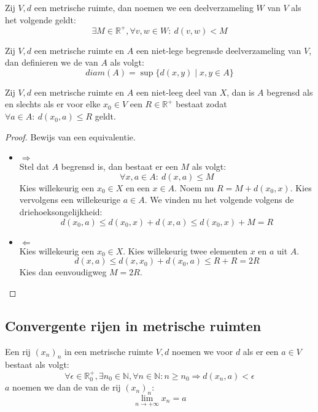 \documentclass[main.tex]{subfiles}
\begin{document}
\begin{de}
  Zij $V,d$ een metrische ruimte, dan noemen we een deelverzameling $W$ van $V$  als het volgende geldt:
  \[ \exists M\in \mathbb{R}^{+}, \forall v,w\in W:\ d(v,w) < M \]
\end{de}

\begin{de}
  Zij $V,d$ een metrische ruimte en $A$ een niet-lege begrensde deelverzameling van $V$, dan definieren we de  van $A$ als volgt:
  \[ diam(A) = \sup\{d(x,y) \mid x,y \in A \} \]
\end{de}

\begin{bpr}
  Zij $V,d$ een metrische ruimte en $A$ een niet-leeg deel van $X$, dan is $A$ begrensd als en slechts als er voor elke $x_{0}\in V$ een $R\in \mathbb{R}^{+}$ bestaat zodat $\forall a\in A:\ d(x_{0},a) \le R$ geldt.

  \begin{proof}
    Bewijs van een equivalentie.
    \begin{itemize}
    \item $\Rightarrow$\\
      Stel dat $A$ begrensd is, dan bestaat er een $M$ als volgt:
      \[ \forall x,a \in A:\ d(x,a) \le M \]
      Kies willekeurig een $x_{0}\in X$ en een $x\in A$.
      Noem nu $R=M + d(x_{0},x)$.
      Kies vervolgens een willekeurige $a\in A$.
      We vinden nu het volgende volgens de driehoeksongelijkheid:
      \[ d(x_{0},a) \le d(x_{0},x) + d(x,a) \le d(x_{0},x) + M = R \]
    \item $\Leftarrow$\\
      Kies willekeurig een $x_{0}\in X$.
      Kies willekeurig twee elementen $x$ en $a$ uit $A$.
      \[ d(x,a) \le d(x,x_{0}) + d(x_{0},a) \le R + R = 2R\]
      Kies dan eenvoudigweg $M=2R$.
    \end{itemize}
  \end{proof}
\end{bpr}

\subsection{Convergente rijen in metrische ruimten}
\label{sec:rijen-metr-ruimt}

\begin{de}
  Een rij $(x_{n})_{n}$ in een metrische ruimte $V,d$ noemen we  voor $d$ als er een $a\in V$ bestaat als volgt:
  \[ \forall \epsilon\in\mathbb{R}_{0}^{+}, \exists n_{0}\in \mathbb{N}, \forall n\in \mathbb{N}: n \ge n_{0} \Rightarrow d(x_{n},a) < \epsilon \]
  $a$ noemen we dan de  van de rij $(x_{n})_{n}$:
  \[ \lim_{n\rightarrow +\infty}x_{n} = a \]
\end{de}
\end{document}

